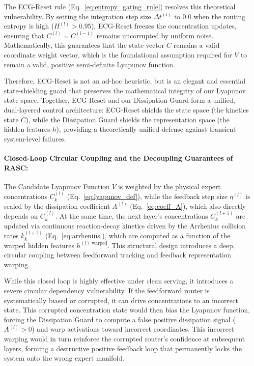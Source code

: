 The ECG-Reset rule (Eq.~\ref{eq:entropy_gating_rule}) resolves this theoretical vulnerability. By setting the integration step size $\Delta t^{(l)}$ to $0.0$ when the routing entropy is high ($H^{(l)} > 0.95$), ECG-Reset freezes the concentration updates, ensuring that $C^{(l)} = C^{(l-1)}$ remains uncorrupted by uniform noise. Mathematically, this guarantees that the state vector $C$ remains a valid coordinate weight vector, which is the foundational assumption required for $V$ to remain a valid, positive semi-definite Lyapunov function.

Therefore, ECG-Reset is not an ad-hoc heuristic, but is an elegant and essential state-shielding guard that preserves the mathematical integrity of our Lyapunov state space. Together, ECG-Reset and our Dissipation Guard form a unified, dual-layered control architecture: ECG-Reset shields the state space (the kinetics state $C$), while the Dissipation Guard shields the representation space (the hidden features $h$), providing a theoretically unified defense against transient system-level failures.

\paragraph{Closed-Loop Circular Coupling and the Decoupling Guarantees of RASC:}
The Candidate Lyapunov Function $V$ is weighted by the physical expert concentrations $C_k^{(l)}$ (Eq.~\ref{eq:lyapunov_def}), while the feedback step size $\eta^{(l)}$ is scaled by the dissipation coefficient $A^{(l)}$ (Eq.~\ref{eq:coeff_A}), which also directly depends on $C_k^{(l)}$. At the same time, the next layer's concentrations $C_k^{(l+1)}$ are updated via continuous reaction-decay kinetics driven by the Arrhenius collision rates $k_k^{(l+1)}$ (Eq.~\ref{eq:arrhenius}), which are computed as a function of the warped hidden features $h^{(l) \text{ warped}}$. This structural design introduces a deep, circular coupling between feedforward tracking and feedback representation warping.

While this closed loop is highly effective under clean serving, it introduces a severe circular dependency vulnerability. If the feedforward router is systematically biased or corrupted, it can drive concentrations to an incorrect state. This corrupted concentration state would then bias the Lyapunov function, forcing the Dissipation Guard to compute a false positive dissipation signal ($A^{(l)} > 0$) and warp activations toward incorrect coordinates. This incorrect warping would in turn reinforce the corrupted router's confidence at subsequent layers, forming a destructive positive feedback loop that permanently locks the system onto the wrong expert manifold.


